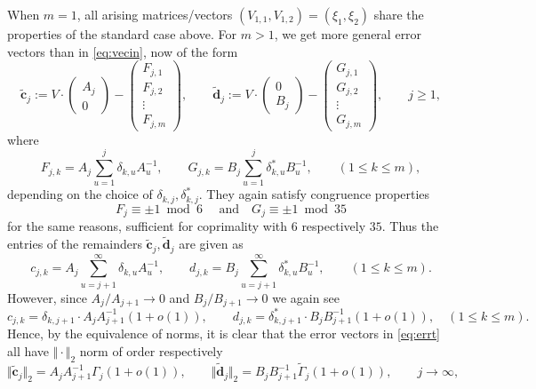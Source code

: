 \documentclass[10pt]{amsart}
\theoremstyle{definition}
\begin{document}
	When $m=1$,
	all arising matrices/vectors $(V_{1,1}, V_{1,2})=(\xi_1, \xi_2)$ share the properties of the standard case above.
	For $m>1$, we get more general error vectors
	than in \eqref{eq:vecin}, now of the form
	\begin{equation}  \label{eq:errt}
	\tilde{\boldsymbol{c}}_j:= V\cdot \begin{pmatrix}
	A_j \\ 0
	\end{pmatrix}
	- \begin{pmatrix}
	F_{j,1} \\ F_{j,2} \\ \vdots \\ F_{j,m}
	\end{pmatrix}, \qquad \tilde{\boldsymbol{d}}_j:= V\cdot \begin{pmatrix}
	0 \\ B_j
	\end{pmatrix}
	- \begin{pmatrix}
	G_{j,1} \\ G_{j,2} \\ \vdots \\ G_{j,m}
	\end{pmatrix},\qquad j\ge 1,
	\end{equation}
	where
	\[
	F_{j,k}= A_j \sum_{u=1}^{j}  \delta_{k,u} A_{u}^{-1}, \qquad
	G_{j,k}= B_j \sum_{u=1}^{j}  \delta_{k,u}^{\ast} B_{u}^{-1}, \qquad (1\le k\le m),
	\]
	depending on the choice of $\delta_{k,j}, \delta_{k,j}^{\ast}$.
 They again satisfy congruence properties $$F_j\equiv \pm 1\bmod 6 \quad \text{ and} \quad G_j\equiv \pm 1\bmod 35$$ for the same reasons, sufficient for coprimality with $6$ respectively $35$.
	Thus the entries of the remainders $\tilde{\boldsymbol{c}}_j, \tilde{\boldsymbol{d}}_j$ are given as
	\[
	c_{j,k}= A_j \sum_{u=j+1}^{\infty}  \delta_{k,u} A_{u}^{-1}, \qquad
	d_{j,k}= B_j \sum_{u=j+1}^{\infty}  \delta_{k,u}^{\ast} B_{u}^{-1}, \qquad (1\le k\le m).
	\]
	However, since $A_j/A_{j+1}\to 0$ and $B_j/B_{j+1}\to 0$ we again see
	\[
	c_{j,k}= \delta_{k,j+1} \cdot A_j A_{j+1}^{-1}(1+o(1)), \qquad d_{j,k}=\delta_{k,j+1}^{\ast} \cdot B_j B_{j+1}^{-1}(1+o(1)), \quad (1\le k\le m).
	\]
 Hence, by the equivalence of norms, 
	it is clear that 
	the error vectors in \eqref{eq:errt} all have $\Vert\cdot\Vert_2$ norm of order respectively 
	\begin{equation}  \label{eq:fertig}
	\Vert \tilde{\boldsymbol{c}}_j\Vert_2= A_j A_{j+1}^{-1} \Gamma_j (1+o(1)), \qquad \Vert \tilde{\boldsymbol{d}}_j\Vert_2=B_j B_{j+1}^{-1} \tilde{\Gamma}_j (1+o(1)),\qquad j\to\infty,
	\end{equation}
\end{document}
